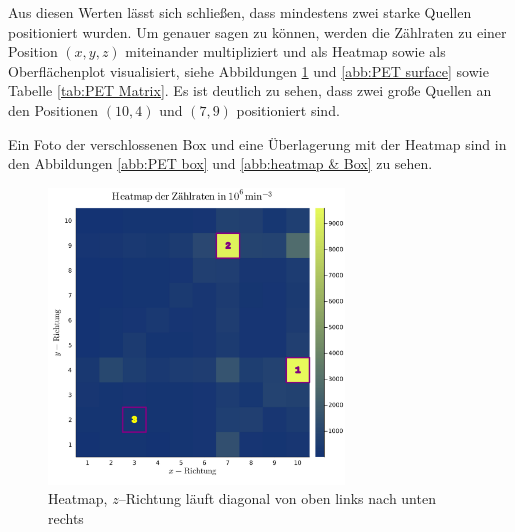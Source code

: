 \documentclass[12pt,a4paper]{scrartcl}
\numberwithin{equation}{section} %
\begin{document}
Aus diesen Werten lässt sich schließen, dass mindestens zwei starke Quellen positioniert wurden. Um genauer sagen zu können, werden die Zählraten zu einer Position $(x,y,z)$ miteinander multipliziert und als Heatmap sowie als Oberflächenplot visualisiert, siehe Abbildungen \ref{abb:PET heatmap} und \ref{abb:PET surface} sowie Tabelle \ref{tab:PET Matrix}. Es ist deutlich zu sehen, dass zwei große Quellen an den Positionen $(10,4)$ und $(7,9)$ positioniert sind.

Ein Foto der verschlossenen Box und eine Überlagerung mit der Heatmap sind in den Abbildungen \ref{abb:PET box} und \ref{abb:heatmap & Box} zu sehen.

\begin{figure}[b!]
	\centering
	\includegraphics[width=0.7\textwidth]{../media/B3.4/heatmap.jpg}
	\caption{Heatmap, $z$--Richtung läuft diagonal von oben links nach unten rechts}
	\label{abb:PET heatmap}
\end{figure}
\end{document}
